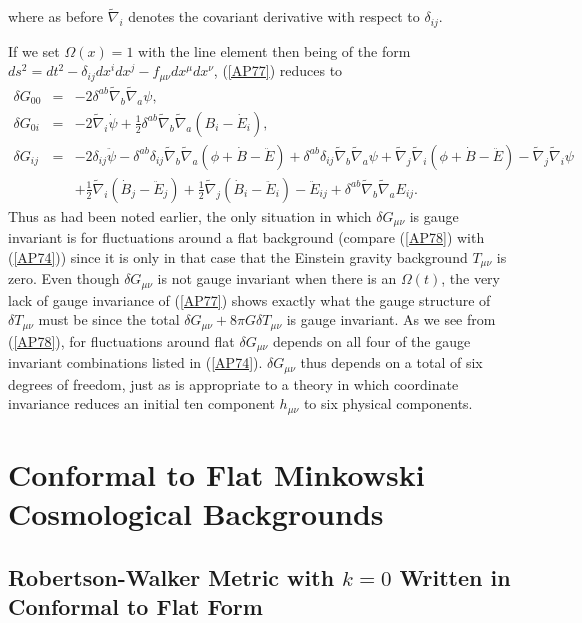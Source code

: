 \documentclass[aps]{revtex4}
\begin{document}
%
where as before $\tilde{\nabla}_{i}$ denotes the covariant derivative with respect to  $\delta_{ij}$.

If we set $\Omega(x)=1$ with the line element then being of the form $ds^2=dt^2-\delta_{ij}dx^idx^j -f_{\mu\nu}dx^{\mu}dx^{\nu}$, (\ref{AP77})  reduces to 
%
\begin{eqnarray}
\delta G_{00}&=&- 2 \delta^{ab} \tilde{\nabla}_{b}\tilde{\nabla}_{a}\psi,
\nonumber\\
\delta G_{0i}&=&- 2 \tilde{\nabla}_{i}\dot{\psi}+ \tfrac{1}{2} \delta^{ab} \tilde{\nabla}_{b}\tilde{\nabla}_{a}(B_{i} -  \dot{E}_{i}),
\nonumber\\
\delta G_{ij}&=&- 2 \delta_{ij} \ddot{\psi} -  \delta^{ab} \delta_{ij} \tilde{\nabla}_{b}\tilde{\nabla}_{a}(\phi+\dot{B}  -\ddot{E})+ \delta^{ab} \delta_{ij} \tilde{\nabla}_{b}\tilde{\nabla}_{a}\psi 
 + \tilde{\nabla}_{j}\tilde{\nabla}_{i}(\phi+\dot{B} -  \ddot{E})  -  \tilde{\nabla}_{j}\tilde{\nabla}_{i}\psi
\nonumber\\
&& + \tfrac{1}{2} \tilde{\nabla}_{i}(\dot{B}_{j} - \ddot{E}_{j}) + \tfrac{1}{2} \tilde{\nabla}_{j}(\dot{B}_{i}  
- \ddot{E}_{i})- \ddot{E}_{ij} + \delta^{ab} \tilde{\nabla}_{b}\tilde{\nabla}_{a}E_{ij}.
\label{AP78}
\end{eqnarray}
%
Thus as had been noted earlier, the only situation in which $\delta G_{\mu\nu}$ is gauge invariant is for fluctuations around a flat background (compare (\ref{AP78}) with (\ref{AP74})) since it is only in that case that the Einstein gravity background $T_{\mu\nu}$ is zero. Even though $\delta G_{\mu\nu}$ is not gauge invariant when there is an $\Omega(t)$, the very lack of gauge invariance of (\ref{AP77}) shows exactly what the gauge structure of $\delta T_{\mu\nu}$ must be since the total $\delta G_{\mu\nu}+8\pi G \delta T_{\mu\nu}$ is gauge invariant. As we see from (\ref{AP78}), for fluctuations around flat $\delta G_{\mu\nu}$ depends on all four of the gauge invariant combinations listed in (\ref{AP74}). $\delta G_{\mu\nu}$ thus depends on a total of six degrees of freedom, just as is appropriate to a theory in which coordinate invariance reduces an initial ten component $h_{\mu\nu}$ to six physical components.

\appendix
\setcounter{equation}{0}
\section{Conformal to Flat Minkowski Cosmological Backgrounds}
\label{SA}

\subsection{Robertson-Walker Metric with $k=0$ Written in Conformal to Flat Form}
\end{document}
